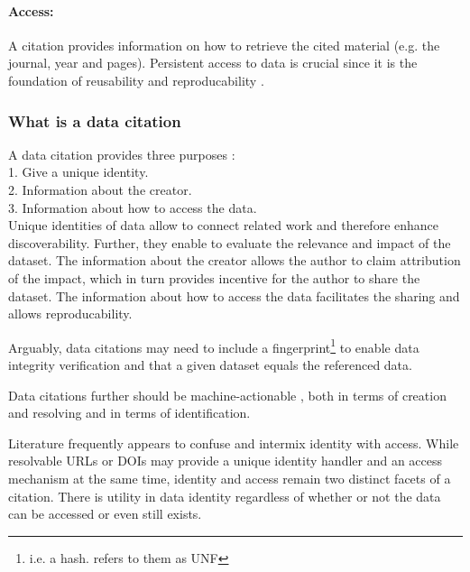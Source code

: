 \documentclass[a4paper,10pt]{article}
\begin{document}
\paragraph{Access:} 
A citation provides information on how to retrieve the cited material (e.g. the journal, year and pages). Persistent access to data is crucial since it is the foundation of reusability and reproducability \citep{Starr2015}.



\subsubsection{What is a data citation}

A data citation provides three purposes \citep{Buneman2010}: \\
1. Give a unique identity. \\
2. Information about the creator. \\
3. Information about how to access the data. \\

Unique identities of data allow to connect related work and therefore enhance discoverability. Further, they enable to evaluate the relevance and impact of the dataset. The information about the creator allows the author to claim attribution of the impact, which in turn provides incentive for the author to share the dataset. The information about how to access the data facilitates the sharing and allows reproducability.

Arguably, data citations may need to include a fingerprint\footnote{i.e. a hash. \citep{Crosas2011} refers to them as \gls{UNF}} to enable data integrity verification \citep{Crosas2011} and that a given dataset equals the referenced data.

Data citations further should be machine-actionable \citep{Assante2016, Altman2015, Buneman2016}, both in terms of creation and resolving and in terms of identification.

Literature frequently appears to confuse and intermix identity with access. While resolvable \glspl{URL} or \glspl{DOI} may provide a unique identity handler and an access mechanism at the same time, identity and access remain two distinct facets of a citation. There is utility in data identity regardless of whether or not the data can be accessed or even still exists.
\end{document}
